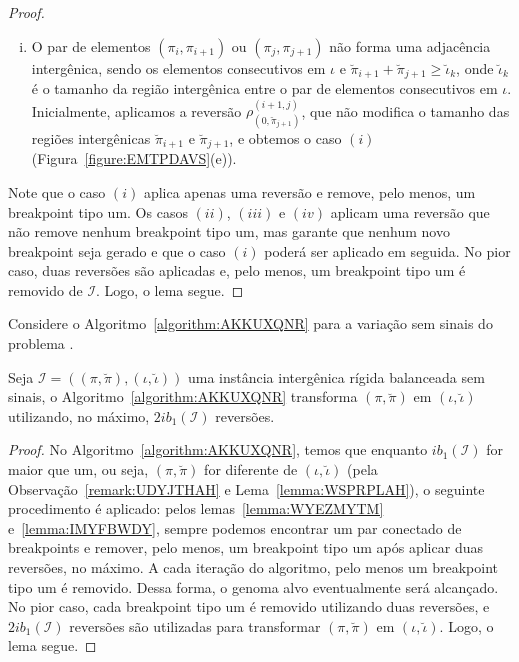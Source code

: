 \begin{proof}
\begin{enumerate}[i.]
    \item O par de elementos $(\pi_{i},\pi_{i+1})$ ou $(\pi_{j},\pi_{j+1})$ não forma uma adjacência intergênica, sendo os elementos consecutivos em $\iota$ e $\breve\pi_{i+1} + \breve\pi_{j+1} \ge \breve\iota_k$, onde $\breve\iota_k$ é o tamanho da região intergênica entre o par de elementos consecutivos em $\iota$. Inicialmente, aplicamos a reversão $\rho^{(i+1, j)}_{(0,\breve\pi_{j+1})}$, que não modifica o tamanho das regiões intergênicas $\breve\pi_{i+1}$ e $\breve\pi_{j+1}$, e obtemos o caso $(i)$ (Figura~\ref{figure:EMTPDAVS}(e)).
\end{enumerate}
Note que o caso $(i)$ aplica apenas uma reversão e remove, pelo menos, um breakpoint tipo um. Os casos $(ii)$, $(iii)$ e $(iv)$ aplicam uma reversão que não remove nenhum breakpoint tipo um, mas garante que nenhum novo breakpoint seja gerado e que o caso $(i)$ poderá ser aplicado em seguida. No pior caso, duas reversões são aplicadas e, pelo menos, um breakpoint tipo um é removido de $\mathcal{I}$. Logo, o lema segue. 
\end{proof}



Considere o Algoritmo~\ref{algorithm:AKKUXQNR} para a variação sem sinais do problema \SbIR{}.  



\begin{lemma}\label{lemma:RBHACFIP}
Seja $\mathcal{I}=((\pi,\breve\pi),(\iota,\breve\iota))$ uma instância intergênica rígida balanceada sem sinais, o Algoritmo~\ref{algorithm:AKKUXQNR} transforma $(\pi,\breve\pi)$ em $(\iota,\breve\iota)$ utilizando, no máximo, $2ib_1(\mathcal{I})$ reversões.
\end{lemma}
\begin{proof}
  No Algoritmo~\ref{algorithm:AKKUXQNR}, temos que enquanto $ib_1(\mathcal{I})$ for maior que um, ou seja, $(\pi,\breve\pi)$ for diferente de $(\iota,\breve\iota)$ (pela Observação~\ref{remark:UDYJTHAH} e Lema~\ref{lemma:WSPRPLAH}), o seguinte procedimento é aplicado: pelos lemas~\ref{lemma:WYEZMYTM} e~\ref{lemma:IMYFBWDY}, sempre podemos encontrar um par conectado de breakpoints e remover, pelo menos, um breakpoint tipo um após aplicar duas reversões, no máximo. A cada iteração do algoritmo, pelo menos um breakpoint tipo um é removido. Dessa forma, o genoma alvo eventualmente será alcançado. No pior caso, cada breakpoint tipo um é removido utilizando duas reversões, e $2ib_1(\mathcal{I})$ reversões são utilizadas para transformar $(\pi,\breve\pi)$ em $(\iota,\breve\iota)$. Logo, o lema segue.
\end{proof}

